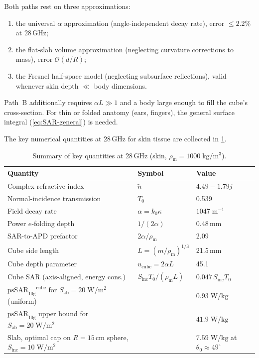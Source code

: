 \documentclass[11pt,a4paper]{article}
\theoremstyle{definition}
\theoremstyle{remark}
\newcommand{\Sab}{S_{\mathrm{ab}}}
\newcommand{\Sinc}{S_{\mathrm{inc}}}
\newcommand{\Tzero}{T_0}
\newcommand{\ntilde}{\tilde{n}}
\newcommand{\psSAR}{\ensuremath{\mathrm{psSAR}_{10\mathrm{g}}}}
\newcommand{\rhom}{\rho_{\mathrm{m}}}
\begin{document}
\medskip\noindent
Both paths rest on three approximations:
\begin{enumerate}[nosep]
\item the universal $\alpha$ approximation (angle-independent decay rate),
  error $\leq 2.2$\% at 28\,GHz;
\item the flat-slab volume approximation (neglecting curvature corrections to
  mass), error $\mathcal{O}(d/R)$;
\item the Fresnel half-space model (neglecting subsurface reflections), valid
  whenever skin depth $\ll$ body dimensions.
\end{enumerate}
Path~B additionally requires $\alpha L \gg 1$ and a body large enough to fill
the cube's cross-section.  For thin or folded anatomy (ears, fingers), the
general surface integral (\cref{eq:SAR-general}) is needed.

The key numerical quantities at 28\,GHz for skin tissue are collected in
\cref{tab:summary}.

\begin{table}[ht]
\centering
\caption{Summary of key quantities at 28\,GHz (skin, $\rhom = 1000\;\mathrm{kg/m^3}$).}
\label{tab:summary}
\begin{tabular}{@{}lll@{}}
\toprule
Quantity & Symbol & Value \\
\midrule
Complex refractive index & $\ntilde$ & $4.49 - 1.79j$ \\
Normal-incidence transmission & $\Tzero$ & 0.539 \\
Field decay rate & $\alpha = k_0\kappa$ & $1047\;\mathrm{m^{-1}}$ \\
Power $e$-folding depth & $1/(2\alpha)$ & 0.48\,mm \\
SAR-to-APD prefactor & $2\alpha/\rhom$ & 2.09 \\
\addlinespace
Cube side length & $L = (m/\rhom)^{1/3}$ & 21.5\,mm \\
Cube depth parameter & $u_{\mathrm{cube}} = 2\alpha L$ & 45.1 \\
\addlinespace
Cube SAR (axis-aligned, energy cons.) & $\Sinc\Tzero/(\rhom L)$ & $0.047\,\Sinc\Tzero$ \\
\addlinespace
$\psSAR^{\mathrm{cube}}$ for $\Sab = 20\;\mathrm{W/m^2}$ (uniform) & & $0.93\;\mathrm{W/kg}$ \\
$\psSAR$ upper bound for $\Sab = 20\;\mathrm{W/m^2}$ & & $41.9\;\mathrm{W/kg}$ \\
Slab, optimal cap on $R=15$\,cm sphere, $\Sinc=10\;\mathrm{W/m^2}$ & & $7.59\;\mathrm{W/kg}$ at $\theta_0 \approx 49^\circ$ \\
\bottomrule
\end{tabular}
\end{table}
\end{document}
